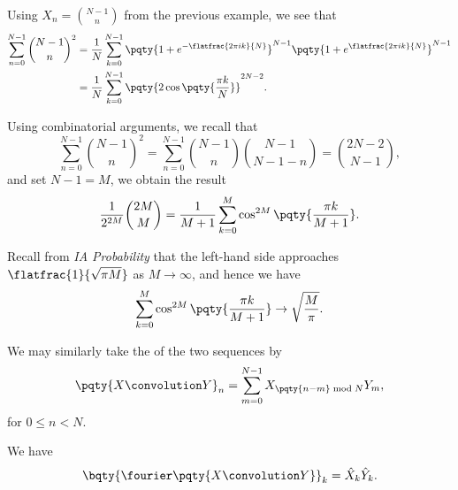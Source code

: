 \begin{example}
    Using \(X_n = \binom{N - 1}{n}\) from the previous example, we see that
    \begin{subequations}
        \begin{align}
            \sum_{n = 0}^{N - 1} \binom{N - 1}{n}^2 &= \frac{1}{N} \sum_{k = 0}^{N - 1} \pqty{1 + e^{- \flatfrac{2 \pi i k}{N}}}^{N - 1} \pqty{1 + e^{\flatfrac{2 \pi i k}{N}}}^{N - 1} \\
            &= \frac{1}{N} \sum_{k = 0}^{N - 1} \pqty{2 \cos \pqty{\frac{\pi k}{N}}}^{2N - 2}.
        \end{align}
    \end{subequations}

    Using combinatorial arguments, we recall that
    \begin{equation}
        \sum_{n = 0}^{N - 1} \binom{N - 1}{n}^2 = \sum_{n = 0}^{N - 1} \binom{N - 1}{n} \binom{N - 1}{N - 1 - n} = \binom{2 N - 2}{N - 1},
    \end{equation}
    and set \(N - 1 = M\), we obtain the result
    \begin{equation}
        \frac{1}{2^{2M}} \binom{2M}{M} = \frac{1}{M + 1} \sum_{k = 0}^{M} \cos^{2M} \pqty{\frac{\pi k}{M + 1}}.
    \end{equation}

    Recall from \textit{IA Probability} that the left-hand side approaches \(\flatfrac{1}{\sqrt{\pi M}}\) as \(M \to \infty\), and hence we have
    \begin{equation}
        \sum_{k = 0}^{M} \cos^{2M} \pqty{\frac{\pi k}{M + 1}} \to \sqrt{\frac{M}{\pi}}.
    \end{equation}
\end{example}

We may similarly take the  of the two sequences by
\begin{equation}
    \pqty{X \convolution Y}_n = \sum_{m = 0}^{N - 1} X_{\pqty{n - m} \bmod N} Y_m,
\end{equation}
for \(0 \leq n < N\).

\begin{proposition}
    We have
    \begin{equation}
        \bqty{\fourier \pqty{X \convolution Y}}_k = \hat{X}_k \hat{Y}_k.
    \end{equation}
\end{proposition}

